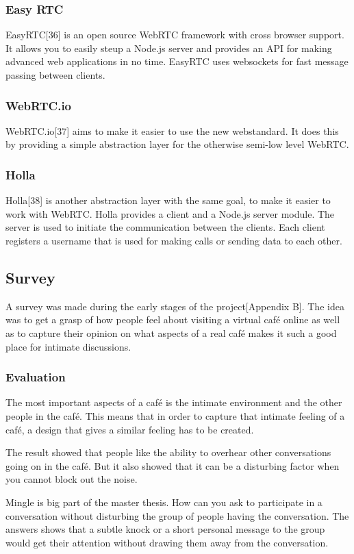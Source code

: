 \documentclass[12pt, titlepage]{article}
\begin{document}
\subsubsection{Easy RTC}
EasyRTC[36] is an open source WebRTC framework with cross browser support. It allows you to easily steup a Node.js server and provides an API for making advanced web applications in no time. EasyRTC uses websockets for fast message passing between clients.
\subsubsection{WebRTC.io}
WebRTC.io[37] aims to make it easier to use the new webstandard. It does this by providing a simple abstraction layer for the otherwise semi-low level WebRTC.
\subsubsection{Holla}
Holla[38] is another abstraction layer with the same goal, to make it easier to work with WebRTC. Holla provides a client and a Node.js server module. The server is used to initiate the communication between the clients. Each client registers a username that is used for making calls or sending data to each other.
\subsection{Survey}
A survey was made during the early stages of the project[Appendix B]. The idea was to get a grasp of how people feel about visiting a virtual café online as well as to capture their opinion on what aspects of a real café makes it such a good place for intimate discussions.
\subsubsection{Evaluation}
The most important aspects of a café is the intimate environment and the other people in the café. This means that in order to capture that intimate feeling of a café, a design that gives a similar feeling has to be created.

The result showed that people like the ability to overhear other conversations going on in the café. But it also showed that it can be a disturbing factor when you cannot block out the noise.

Mingle is big part of the master thesis. How can you ask to participate in a conversation without disturbing the group of people having the conversation. The answers shows that a subtle knock or a short personal message to the group would get their attention without drawing them away from the conversation.
\end{document}
